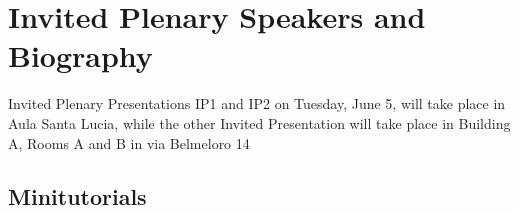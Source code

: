 \documentclass[9pt, a4paper]{book}
\begin{document}
\pagestyle{fancy} %






\chapter*{Invited Plenary Speakers and Biography}
{\small{Invited Plenary Presentations  IP1 and IP2 on Tuesday, June 5, will take place in Aula Santa Lucia, while the other Invited Presentation will take place in Building A, Rooms A and B in via Belmeloro 14}}



\newpage
\section*{Minitutorials}



%
%
%
%
\end{document}
